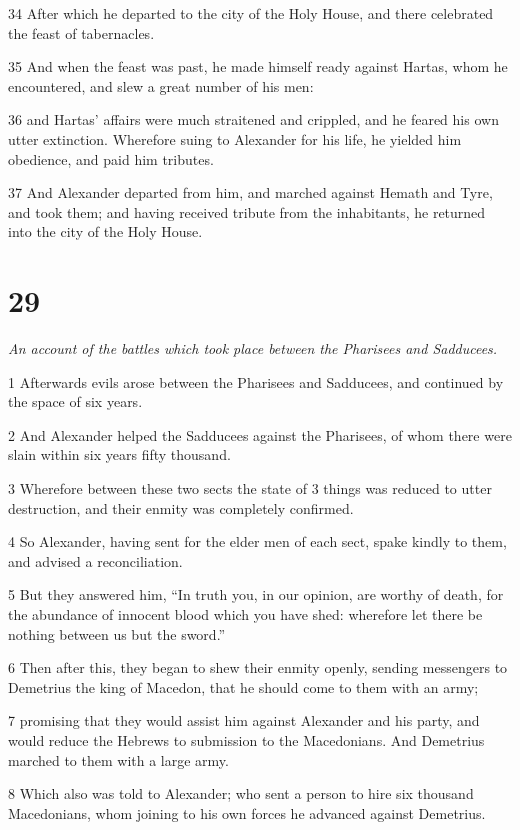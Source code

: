 34 After which he departed to the city of the Holy House, and there celebrated the feast of tabernacles. 

35 And when the feast was past, he made himself ready against Hartas, whom he encountered, and slew a great number of his men: 

36 and Hartas’ affairs were much straitened and crippled, and he feared his own utter extinction. Wherefore suing to Alexander for his life, he yielded him obedience, and paid him tributes. 

37 And Alexander departed from him, and marched against Hemath and Tyre, and took them; and having received tribute from the inhabitants, he returned into the city of the Holy House. 

\chapter{29}

\par \textit{An account of the battles which took place between the Pharisees and Sadducees.}

1 Afterwards evils arose between the Pharisees and Sadducees, and continued by the space of six years. 

2 And Alexander helped the Sadducees against the Pharisees, of whom there were slain within six years fifty thousand. 

3 Wherefore between these two sects the state of 3 things was reduced to utter destruction, and their enmity was completely confirmed. 

4 So Alexander, having sent for the elder men of each sect, spake kindly to them, and advised a reconciliation. 

5 But they answered him, “In truth you, in our opinion, are worthy of death, for the abundance of innocent blood which you have shed: wherefore let there be nothing between us but the sword.” 

6 Then after this, they began to shew their enmity openly, sending messengers to Demetrius the king of Macedon, that he should come to them with an army; 

7 promising that they would assist him against Alexander and his party, and would reduce the Hebrews to submission to the Macedonians. And Demetrius marched to them with a large army.

8 Which also was told to Alexander; who sent a person to hire six thousand Macedonians, whom joining to his own forces he advanced against Demetrius. 


